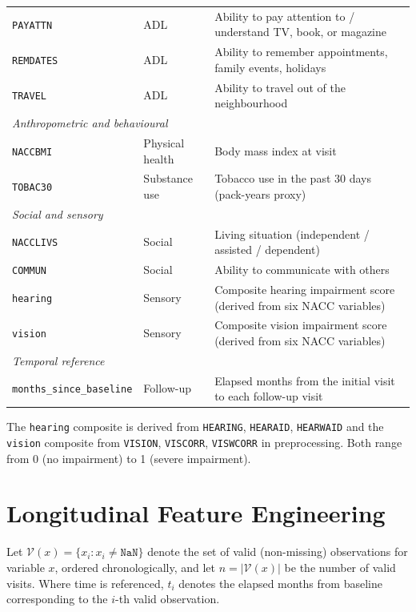 \documentclass[11pt]{article}
\begin{document}
\begin{longtable}{@{}lll@{}}
\texttt{PAYATTN}  & ADL & Ability to pay attention to / understand TV, book, or magazine \\
\texttt{REMDATES} & ADL & Ability to remember appointments, family events, holidays \\
\texttt{TRAVEL}   & ADL & Ability to travel out of the neighbourhood \\[6pt]
\multicolumn{3}{l}{\textit{Anthropometric and behavioural}} \\[2pt]
\texttt{NACCBMI}  & Physical health & Body mass index at visit \\
\texttt{TOBAC30}  & Substance use   & Tobacco use in the past 30 days (pack-years proxy) \\[6pt]
\multicolumn{3}{l}{\textit{Social and sensory}} \\[2pt]
\texttt{NACCLIVS} & Social          & Living situation (independent / assisted / dependent) \\
\texttt{COMMUN}   & Social          & Ability to communicate with others \\
\texttt{hearing}  & Sensory         & Composite hearing impairment score (derived from six NACC variables) \\
\texttt{vision}   & Sensory         & Composite vision impairment score (derived from six NACC variables) \\[6pt]
\multicolumn{3}{l}{\textit{Temporal reference}} \\[2pt]
\texttt{months\_since\_baseline} & Follow-up & Elapsed months from the initial visit to each follow-up visit \\
\end{longtable}

The \texttt{hearing} composite is derived from \texttt{HEARING}, \texttt{HEARAID}, \texttt{HEARWAID} and the \texttt{vision} composite from \texttt{VISION}, \texttt{VISCORR}, \texttt{VISWCORR} in preprocessing.  Both range from 0 (no impairment) to 1 (severe impairment).

\section{Longitudinal Feature Engineering}
\label{sec:fe}

Let $\mathcal{V}(x) = \{x_{i} : x_{i} \neq \texttt{NaN}\}$ denote the set of valid (non-missing) observations for variable $x$, ordered chronologically, and let $n = |\mathcal{V}(x)|$ be the number of valid visits.  Where time is referenced, $t_i$ denotes the elapsed months from baseline corresponding to the $i$-th valid observation.
\end{document}
